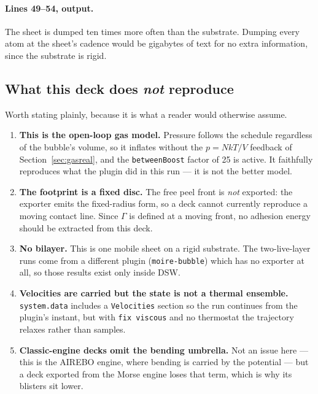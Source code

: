 \documentclass[11pt,a4paper]{article}
\begin{document}
\paragraph{Lines 49--54, output.} The sheet is dumped ten times more often than
the substrate. Dumping every atom at the sheet's cadence would be gigabytes of
text for no extra information, since the substrate is rigid.

\subsection*{What this deck does \emph{not} reproduce}

Worth stating plainly, because it is what a reader would otherwise assume.

\begin{enumerate}
\item \textbf{This is the open-loop gas model.} Pressure follows the schedule
      regardless of the bubble's volume, so it inflates without the
      $p = NkT/V$ feedback of Section~\ref{sec:gasreal}, and the
      \texttt{betweenBoost} factor of 25 is active. It faithfully reproduces
      what the plugin did in this run --- it is not the better model.
\item \textbf{The footprint is a fixed disc.} The free peel front is
      \emph{not} exported: the exporter emits the fixed-radius form, so a deck
      cannot currently reproduce a moving contact line. Since $\Gamma$ is defined
      at a moving front, no adhesion energy should be extracted from this deck.
\item \textbf{No bilayer.} This is one mobile sheet on a rigid substrate. The
      two-live-layer runs come from a different plugin (\texttt{moire-bubble})
      which has no exporter at all, so those results exist only inside DSW.
\item \textbf{Velocities are carried but the state is not a thermal ensemble.}
      \texttt{system.data} includes a \texttt{Velocities} section so the run
      continues from the plugin's instant, but with \texttt{fix viscous} and no
      thermostat the trajectory relaxes rather than samples.
\item \textbf{Classic-engine decks omit the bending umbrella.} Not an issue
      here --- this is the AIREBO engine, where bending is carried by the
      potential --- but a deck exported from the Morse engine loses that term,
      which is why its blisters sit lower.
\end{enumerate}
\end{document}
